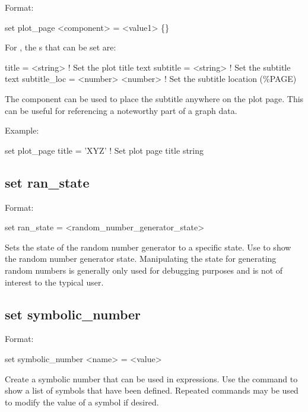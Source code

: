 {{{{{Format:
\begin{example}
  set plot_page <component> = <value1> \{<value2>\}
\end{example}

For , the s that can be set are:
\begin{example}
  title        = <string>          ! Set the plot title text
  subtitle     = <string>          ! Set the subtitle text
  subtitle_loc = <number> <number> ! Set the subtitle location (\%PAGE)
\end{example}
The  component can be used to place the subtitle anywhere on the plot
page. This can be useful for referencing a noteworthy part of a graph data.

Example:
\begin{example}
  set plot_page title = 'XYZ'  ! Set plot page title string
\end{example}


\subsection{set ran\_state}
\label{s:set.ran.state}

Format:
\begin{example}
  set ran_state = <random_number_generator_state>
\end{example}

Sets the state of the random number generator to a specific state. Use 
to show the random number generator state. Manipulating the state for generating random numbers is
generally only used for debugging purposes and is not of interest to the typical user.


\subsection{set symbolic_number}
\label{s:set.symbolic}

Format:
\begin{example}
  set symbolic_number <name> = <value>
\end{example}

Create a symbolic number that can be used in expressions. Use the  command
to show a list of symbols that have been defined. Repeated  commands may be used to modify
the value of a symbol if desired.

}}}}}
